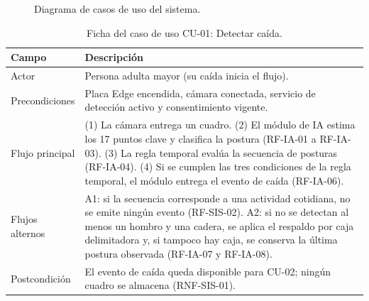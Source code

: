\documentclass[12pt,a4paper,oneside]{book}
\theoremstyle{plain}
\theoremstyle{definition}
\theoremstyle{remark}
\begin{document}
\begin{figure}
    \caption{Diagrama de casos de uso del sistema.}
    \label{fig:casos_uso}
\end{figure}
\newpage

\begin{table}[H]
\centering
\caption{Ficha del caso de uso CU-01: Detectar caída.}
\label{tab:cu-01}
\small
\begin{tabular}{L{3.0cm}L{9.0cm}}
\toprule
\textbf{Campo} & \textbf{Descripción} \\
\midrule
Actor & Persona adulta mayor (su caída inicia el flujo). \\
\addlinespace
Precondiciones & Placa Edge encendida, cámara conectada, servicio de detección activo y consentimiento vigente. \\
\addlinespace
Flujo principal & (1) La cámara entrega un cuadro. (2) El módulo de IA estima los 17 puntos clave y clasifica la postura (RF-IA-01 a RF-IA-03). (3) La regla temporal evalúa la secuencia de posturas (RF-IA-04). (4) Si se cumplen las tres condiciones de la regla temporal, el módulo entrega el evento de caída (RF-IA-06). \\
\addlinespace
Flujos alternos & A1: si la secuencia corresponde a una actividad cotidiana, no se emite ningún evento (RF-SIS-02). A2: si no se detectan al menos un hombro y una cadera, se aplica el respaldo por caja delimitadora y, si tampoco hay caja, se conserva la última postura observada (RF-IA-07 y RF-IA-08). \\
\addlinespace
Postcondición & El evento de caída queda disponible para CU-02; ningún cuadro se almacena (RNF-SIS-01). \\
\bottomrule
\end{tabular}
\end{table}
\end{document}
